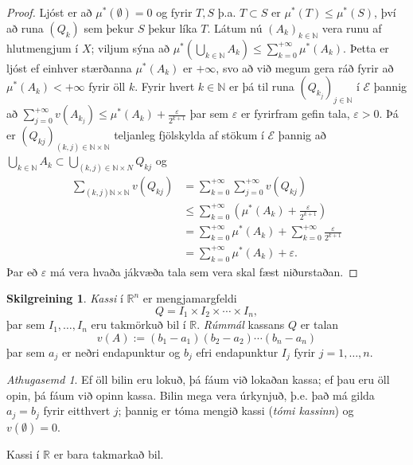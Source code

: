 \documentclass[a4paper,icelandic,11pt]{book}
\theoremstyle{plain}      \newtheorem{setn}{Setning}[chapter]
\theoremstyle{definition} \newtheorem{skilgr}[setn]{Skilgreining}
\theoremstyle{remark}     \newtheorem*{ath}{Athugasemd}
\newcommand{\R}{\mathbb R}
\newcommand{\N}{\mathbb N}
\begin{document}
\begin{proof}
  Ljóst er að $\mu^{*}(\emptyset)=0$ og fyrir $T,S$ þ.a. $T\subset S$
  er $\mu^{*}(T)\le\mu^{*}(S)$, því að runa $(Q_{k})$ sem þekur $S$
  þekur líka $T$. Látum nú $(A_{k})_{k\in\N}$ vera runu af hlutmengjum
  í $X$; viljum sýna að
  $\mu^{*}(\bigcup_{k\in\N}A_{k})\le\sum_{k=0}^{+\infty}\mu^{*}(A_{k})$. Þetta
  er ljóst ef einhver stærðanna $\mu^{*}(A_{k})$ er $+\infty$, svo að
  við megum gera ráð fyrir að $\mu^{*}(A_{k})<+\infty$ fyrir öll
  $k$. Fyrir hvert $k\in\N$ er þá til runa $(Q_{k_{j}})_{j\in\N}$ í
  $\mathcal E$ þannig að
  $\sum_{j=0}^{+\infty}v(A_{k_{j}})\le\mu^{*}(A_{k})+\frac{\varepsilon}{2^{k+1}}$
  þar sem $\varepsilon$ er fyrirfram gefin tala, $\varepsilon > 0$. Þá
  er $(Q_{kj})_{(k,j)\in\N\times\N}$ teljanleg fjölskylda af stökum í
  $\mathcal E$ þannig að
  $\bigcup_{k\in\N}A_{k}\subset\bigcup_{(k,j)\in\N\times N}Q_{kj}$ og
  \begin{align*}
    \sum_{(k,j)\N\times\N}v(Q_{kj})
    &= \sum_{k=0}^{+\infty}\sum_{j=0}^{+\infty}v(Q_{kj}) \\
    &\le
    \sum_{k=0}^{+\infty}(\mu^{*}(A_{k})+\frac\varepsilon{2^{k+1}}) \\
    &= \sum_{k=0}^{+\infty}\mu^{*}(A_{k})
    + \sum_{k=0}^{+\infty}\frac\varepsilon{2^{k+1}} \\
    &= \sum_{k=0}^{+\infty}\mu^{*}(A_{k}) + \varepsilon.
  \end{align*}
  Þar eð $\varepsilon$ má vera hvaða jákvæða tala sem vera skal fæst
  niðurstaðan.
\end{proof}
\begin{skilgr}
  \emph{Kassi} í $\R^{n}$ er mengjamargfeldi
  \[
  Q = I_{1}\times I_{2}\times\cdots\times I_{n},
  \]
  þar sem $I_{1},\dots,I_{n}$ eru takmörkuð bil í
  $\R$. \emph{Rúmmál} kassans $Q$ er talan
  \[
  v(A) := (b_{1}-a_{1})(b_{2}-a_{2})\cdots(b_{n}-a_{n})
  \]
  þar sem $a_{j}$ er neðri endapunktur og $b_{j}$ efri endapunktur
  $I_{j}$ fyrir $j=1,\dots,n$.
\end{skilgr}
\begin{ath}
  Ef öll bilin eru lokuð, þá fáum við lokaðan kassa; ef þau eru öll
  opin, þá fáum við opinn kassa. Bilin mega vera úrkynjuð, þ.e. það má
  gilda $a_{j}=b_{j}$ fyrir eitthvert $j$; þannig er tóma mengið kassi
  (\emph{tómi kassinn}) og $v(\emptyset)=0$.
\end{ath}
Kassi í $\mathbb R$ er bara takmarkað bil.
\end{document}
